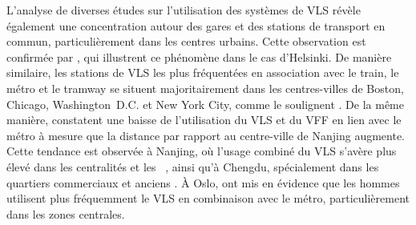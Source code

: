 \begin{refsegment}
L'analyse de diverses études sur l'utilisation des systèmes de \acrshort{VLS} révèle également une concentration autour des gares et des stations de transport en commun, particulièrement dans les centres urbains. Cette observation est confirmée par \textcolor{blue}{\textcite[23]{jappinen_modelling_2013}}, qui illustrent ce phénomène dans le cas d'Helsinki. De manière similaire, les stations de \acrshort{VLS} les plus fréquentées en association avec le train, le métro et le tramway se situent majoritairement dans les centres-villes de Boston, Chicago, Washington~D.C. et New York City, comme le soulignent \textcolor{blue}{\textcite[11]{kong_deciphering_2020}}. De la même manière, \textcolor{blue}{\textcite[14]{chen_what_2022}} constatent une baisse de l'utilisation du \acrshort{VLS} et du \acrshort{VFF} en lien avec le métro à mesure que la distance par rapport au centre-ville de Nanjing augmente. Cette tendance est observée à Nanjing, où l'usage combiné du \acrshort{VLS} s'avère plus élevé dans les centralités et les ~\textcolor{blue}{\autocite[8-9]{cheng_promoting_2022}}, ainsi qu'à Chengdu, spécialement dans les quartiers commerciaux et anciens \textcolor{blue}{\autocite[884]{bi_analysis_2021}}. À Oslo, \textcolor{blue}{\textcite[394]{bocker_bike_2020}} ont mis en évidence que les hommes utilisent plus fréquemment le \acrshort{VLS} en combinaison avec le métro, particulièrement dans les zones centrales.%


\end{refsegment}
